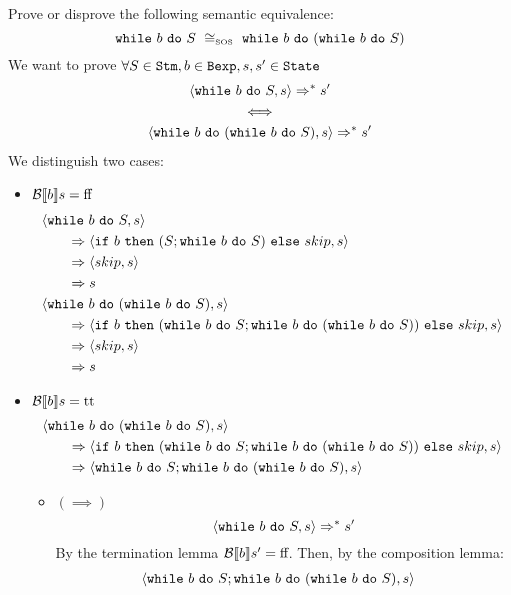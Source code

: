\begin{exercise}{
    Prove or disprove the following semantic equivalence:
    \[ \wwhile{b}{S}\ \SOScong\ \wwhile{b}{(\wwhile{b}{S})} \]
}
    We want to prove $\forall S \in \texttt{Stm}, b \in \texttt{Bexp}, s, s' \in \texttt{State}$
    \begin{gather*}
        \left<\texttt{while}\ b\ \texttt{do}\ S, s\right> \Rightarrow^* s' \\
        \iff \\
        \left<\texttt{while}\ b\ \texttt{do}\ (\texttt{while}\ b\ \texttt{do}\ S), s\right> \Rightarrow^* s'
    \end{gather*}
    We distinguish two cases:
    \begin{itemize}
        \item $\mathcal{B} \llbracket b \rrbracket s = \text{ff}$
            \begin{align*}
                &\left<\texttt{while}\ b\ \texttt{do}\ S, s\right>
                \\&\qquad\Rightarrow \left<\texttt{if}\ b\ \texttt{then}\ (S; \texttt{while}\ b\ \texttt{do}\ S)\ \texttt{else}\ skip, s\right>
                \\&\qquad\Rightarrow \left<skip, s\right>
                \\&\qquad\Rightarrow s
                \\
                &\left<\texttt{while}\ b\ \texttt{do}\ (\texttt{while}\ b\ \texttt{do}\ S), s\right>
                \\&\qquad\Rightarrow \left<\texttt{if}\ b\ \texttt{then}\ (\texttt{while}\ b\ \texttt{do}\ S; \texttt{while}\ b\ \texttt{do}\ (\texttt{while}\ b\ \texttt{do}\ S))\ \texttt{else}\ skip, s\right>
                \\&\qquad\Rightarrow \left<skip, s\right>
                \\&\qquad\Rightarrow s
            \end{align*}
        \item $\mathcal{B} \llbracket b \rrbracket s = \text{tt}$
            \begin{align*}
                &\left<\texttt{while}\ b\ \texttt{do}\ (\texttt{while}\ b\ \texttt{do}\ S), s\right>
                \\&\qquad\Rightarrow \left<\texttt{if}\ b\ \texttt{then}\ (\texttt{while}\ b\ \texttt{do}\ S; \texttt{while}\ b\ \texttt{do}\ (\texttt{while}\ b\ \texttt{do}\ S))\ \texttt{else}\ skip, s\right>
                \\&\qquad\Rightarrow \left<\texttt{while}\ b\ \texttt{do}\ S; \texttt{while}\ b\ \texttt{do}\ (\texttt{while}\ b\ \texttt{do}\ S), s\right>
            \end{align*}
            \begin{itemize}
                \item $(\implies)$
                    \[ \left<\texttt{while}\ b\ \texttt{do}\ S, s\right> \Rightarrow^* s' \]
                    By the termination lemma $\mathcal{B} \llbracket b \rrbracket s' = \text{ff}$. Then, by the composition lemma:
                    \begin{align*}
                        &\instr{\wwhile{b}{S}; \wwhile{b}{(\wwhile{b}{S})}}{s}

\end{align*}
\end{itemize}
\end{itemize}
\end{exercise}
